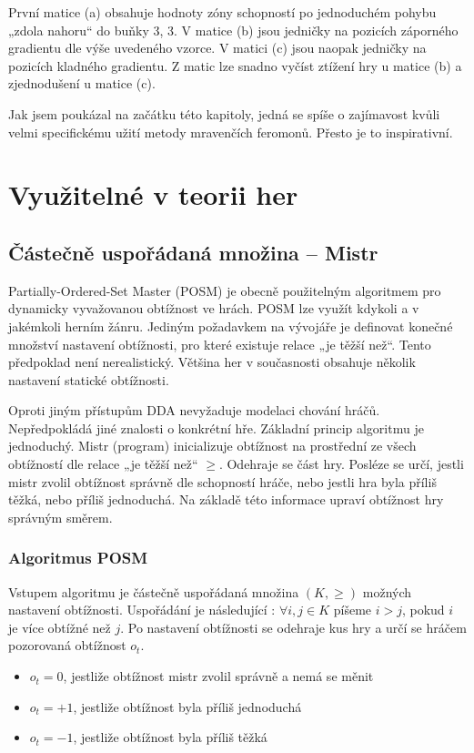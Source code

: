 První matice (a) obsahuje hodnoty zóny schopností po jednoduchém pohybu „zdola nahoru“ do buňky 3, 3. V matice (b) jsou jedničky na pozicích záporného gradientu dle výše uvedeného vzorce. V matici (c) jsou naopak jedničky na pozicích kladného gradientu. Z matic lze snadno vyčíst ztížení hry u matice (b) a zjednodušení u matice (c).

Jak jsem poukázal na začátku této kapitoly, jedná se spíše o zajímavost kvůli velmi specifickému užití metody mravenčích feromonů. Přesto je to inspirativní.


\section{Využitelné v teorii her}

\subsection{Částečně uspořádaná množina – Mistr}

Partially-Ordered-Set Master (POSM) \cite{22posm1} je obecně použitelným algoritmem pro dynamicky vyvažovanou obtížnost ve hrách. POSM lze využít kdykoli a v jakémkoli herním žánru. Jediným požadavkem na vývojáře je definovat konečné množství nastavení obtížnosti, pro které existuje relace „je těžší než“. Tento předpoklad není nerealistický. Většina her v současnosti obsahuje několik nastavení statické obtížnosti.

Oproti jiným přístupům DDA nevyžaduje modelaci chování hráčů. Nepředpokládá jiné znalosti o konkrétní hře. 
Základní princip algoritmu je jednoduchý. Mistr (program) inicializuje obtížnost na prostřední ze všech obtížností dle relace „je těžší než“ $\geq$. Odehraje se část hry. Posléze se určí, jestli mistr zvolil obtížnost správně dle schopností hráče, nebo jestli hra byla příliš těžká, nebo příliš jednoduchá. Na základě této informace upraví obtížnost hry správným směrem.

\subsubsection{Algoritmus POSM}

Vstupem algoritmu je částečně uspořádaná množina $(K,\geq)$ možných nastavení obtížnosti. Uspořádání je následující : $\forall i,j \in K$ píšeme $i>j$, pokud $i$ je více obtížné než $j$.
Po nastavení obtížnosti se odehraje kus hry a určí se hráčem pozorovaná obtížnost $o_t$.

\begin{itemize}
	\item $o_t=0$, jestliže obtížnost mistr zvolil správně a nemá se měnit
	\item $o_t=+1$, jestliže obtížnost byla příliš jednoduchá
	\item $o_t=-1$, jestliže obtížnost byla příliš těžká
\end{itemize}
	
